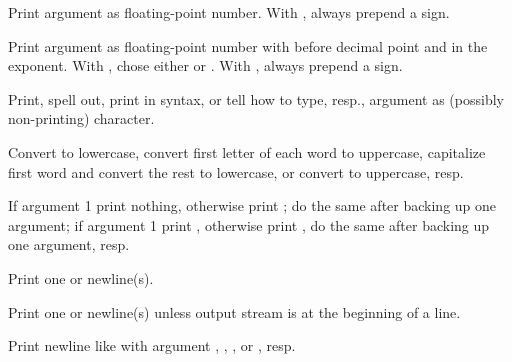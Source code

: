 \begin{LIST}{1cm}
\begin{LIST}{.5cm}
    {
    Print argument as floating-point number. With , always prepend a sign.
  }

    {
    Print argument as floating-point number with 
    before decimal point and  in the
    exponent. With , chose either  or . With , always prepend a sign.
  }

    {
    Print, spell out, print in \kwd{\#$\backslash$} syntax, or tell how to type, resp., argument as
    (possibly non-printing) character.
  }

    {
    Convert to lowercase, convert first letter of each word to
    uppercase, capitalize first word and convert
    the rest to lowercase, or convert to uppercase, resp.
  }

    {
    If argument  1 print nothing, otherwise print ;
    do the same after backing up one argument; if argument  1
    print , otherwise print , do the same after
    backing up one argument, resp. 
  }

    {
    Print one or  newline(s).
  }

    {
    Print one or  newline(s) unless output stream is at the
    beginning of a line.
  }

    {
    Print newline like  with argument
    , , , or , resp.
  }


\end{LIST}
\end{LIST}
